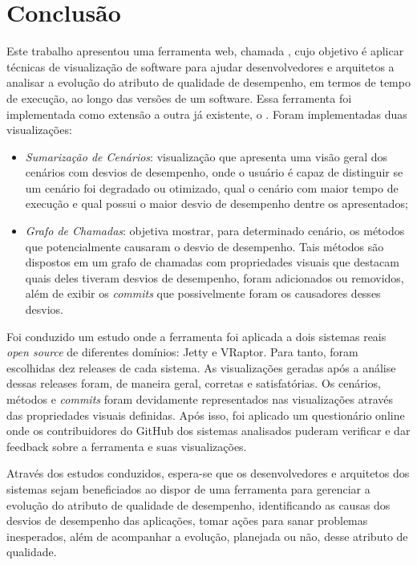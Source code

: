 \chapter{Conclusão} \label{ch:conclusao}

Este trabalho apresentou uma ferramenta web, chamada \textit{\toolName}, cujo objetivo é aplicar técnicas de visualização de software para ajudar desenvolvedores e arquitetos a analisar a evolução do atributo de qualidade de desempenho, em termos de tempo de execução, ao longo das versões de um software. Essa ferramenta foi implementada como extensão a outra já existente, o \textit{\perfMinerName}. Foram implementadas duas visualizações:
\begin{itemize}
	\item \textit{Sumarização de Cenários}: visualização que apresenta uma visão geral dos cenários com desvios de desempenho, onde o usuário é capaz de distinguir se um cenário foi degradado ou otimizado, qual o cenário com maior tempo de execução e qual possui o maior desvio de desempenho dentre os apresentados;
	\item \textit{Grafo de Chamadas}: objetiva mostrar, para determinado cenário, os métodos que potencialmente causaram o desvio de desempenho. Tais métodos são dispostos em um grafo de chamadas com propriedades visuais que destacam quais deles tiveram desvios de desempenho, foram adicionados ou removidos, além de exibir os \textit{commits} que possivelmente foram os causadores desses desvios.
\end{itemize}

Foi conduzido um estudo onde a ferramenta foi aplicada a dois sistemas reais \textit{open source} de diferentes domínios: Jetty e VRaptor. Para tanto, foram escolhidas dez releases de cada sistema. As visualizações geradas após a análise dessas releases foram, de maneira geral, corretas e satisfatórias. Os cenários, métodos e \textit{commits} foram devidamente representados nas visualizações através das propriedades visuais definidas. Após isso, foi aplicado um questionário online onde os contribuidores do GitHub dos sistemas analisados puderam verificar e dar feedback sobre a ferramenta e suas visualizações.

Através dos estudos conduzidos, espera-se que os desenvolvedores e arquitetos dos sistemas sejam beneficiados ao dispor de uma ferramenta para gerenciar a evolução do atributo de qualidade de desempenho, identificando as causas dos desvios de desempenho das aplicações, tomar ações para sanar problemas inesperados, além de acompanhar a evolução, planejada ou não, desse atributo de qualidade.


